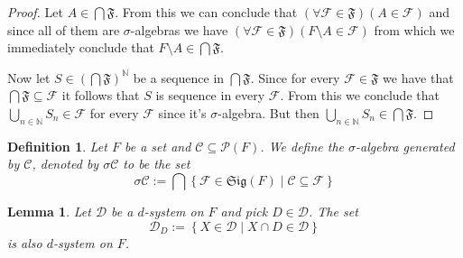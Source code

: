\documentclass[a4paper]{amsart}
\newtheorem{deff}{Definition}
\newtheorem{lem}{Lemma}
\newcommand{\pow}[1]{\mathscr{P}\left(#1\right)}
\newcommand{\sig}[1]{\mathfrak{Sig}\left(#1\right)}
\newcommand{\NN}{\mathbb{N}}
\begin{document}
\begin{proof}
    Let $A \in \bigcap \mathfrak{F}$. From this we can conclude that 
    $\left(\forall \mathcal{F} \in \mathfrak{F}\right) \left(A \in \mathcal{F}\right) $ and since all of them are $\sigma$-algebras we have 
    $\left(\forall \mathcal{F} \in \mathfrak{F}\right) \left(F \setminus A \in \mathcal{F}\right)$ 
    from which we immediately conclude that $F \setminus A \in \bigcap \mathfrak{F}$.
    
    Now let $S \in \left(\bigcap\mathfrak{F}\right)^\NN$ be a 
    sequence in $\bigcap\mathfrak{F}$. Since for every 
    $\mathcal{F} \in \mathfrak{F}$ we have that
    $\bigcap\mathfrak{F} \subseteq \mathcal{F}$ it follows 
    that $S$ is sequence in every $\mathcal{F}$. From this we 
    conclude that 
    $\bigcup\limits_{n\in \NN} S_n \in \mathcal{F}$ for every $\mathcal{F}$ 
    since it's $\sigma$-algebra. 
    But then  $ \bigcup\limits_{n\in \NN} S_n \in  \bigcap \mathfrak{F}$.
\end{proof}

\begin{deff}
    Let $F$ be a set and $\mathcal{C} \subseteq \pow{F}$. We define the $\sigma$-algebra generated by $\mathcal{C}$, denoted by $\sigma\mathcal{C}$ to be the set
    $$
    \sigma\mathcal{C} := \bigcap\left\{ \mathcal{F} \in \sig{F} \mid \mathcal{C} \subseteq \mathcal{F} \right\}
    $$
\end{deff}

\begin{lem}
    Let $\mathcal{D}$ be a $d$-system on $F$ and pick $D \in \mathcal{D}$. The set 
    $$ \mathcal{D}_D := \left\{ X \in \mathcal{D} \mid X \cap D \in \mathcal{D} \right\} $$
    is also $d$-system on $F$.
\end{lem}
\end{document}
